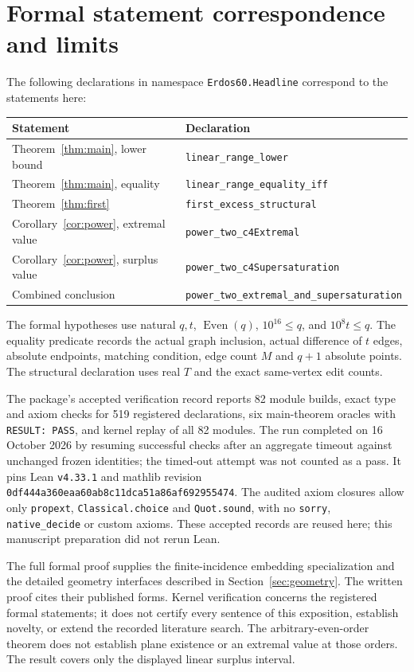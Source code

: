 \documentclass[11pt]{article}
\theoremstyle{remark}\newtheorem*{remark}{Remark}
\begin{document}
\section{Formal statement correspondence and limits}\label{sec:formal}
The following declarations in namespace \texttt{Erdos60.Headline} correspond to the statements here:
\begin{center}\small
\begin{tabular}{p{}p{}}
\toprule
Statement & Declaration \\\midrule
Theorem~\ref{thm:main}, lower bound & \texttt{linear\_range\_lower}\\
Theorem~\ref{thm:main}, equality & \texttt{linear\_range\_equality\_iff}\\
Theorem~\ref{thm:first} & \texttt{first\_excess\_structural}\\
Corollary~\ref{cor:power}, extremal value & \texttt{power\_two\_c4Extremal}\\
Corollary~\ref{cor:power}, surplus value & \texttt{power\_two\_c4Supersaturation}\\
Combined conclusion & \texttt{power\_two\_extremal\_and\_supersaturation}\\
\bottomrule
\end{tabular}
\end{center}
The formal hypotheses use natural $q,t$, $\operatorname{Even}(q)$, $10^{16}\leq q$, and $10^8t\leq q$. The equality predicate records the actual graph inclusion, actual difference of $t$ edges, absolute endpoints, matching condition, edge count $M$ and $q+1$ absolute points. The structural declaration uses real $T$ and the exact same-vertex edit counts.

The package's accepted verification record reports 82 module builds, exact type and axiom checks for 519 registered declarations, six main-theorem oracles with \texttt{RESULT: PASS}, and kernel replay of all 82 modules. The run completed on 16 October 2026 by resuming successful checks after an aggregate timeout against unchanged frozen identities; the timed-out attempt was not counted as a pass. It pins Lean \texttt{v4.33.1} and mathlib revision \texttt{0df444a360eaa60ab8c11dca51a86af692955474}. The audited axiom closures allow only \texttt{propext}, \texttt{Classical.choice} and \texttt{Quot.sound}, with no \texttt{sorry}, \texttt{native\_decide} or custom axioms. These accepted records are reused here; this manuscript preparation did not rerun Lean.

The full formal proof supplies the finite-incidence embedding specialization and the detailed geometry interfaces described in Section~\ref{sec:geometry}. The written proof cites their published forms. Kernel verification concerns the registered formal statements; it does not certify every sentence of this exposition, establish novelty, or extend the recorded literature search. The arbitrary-even-order theorem does not establish plane existence or an extremal value at those orders. The result covers only the displayed linear surplus interval.
\end{document}
